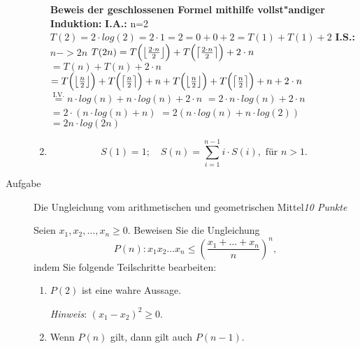 \documentclass[a4paper,twoside,12pt]{article}
\newcounter{AUFGNR}
\newcommand{\AUFGABE}[2]{\vspace{0.3cm}\item[Aufgabe \arabic{AUFGNR}]\stepcounter{AUFGNR} #1\hfill\emph{#2}}
\begin{document}
\begin{description}
\begin{enumerate}
\smallskip
\smallskip
\textbf{Beweis der geschlossenen Formel mithilfe vollst"andiger Induktion:}
\newline
\newline \textbf{I.A.:}
\newline n=2
\newline $T(2)=2 \cdot log(2)=2 \cdot 1=2=0+0+2=T(1)+T(1)+2$
\newline
\newline \textbf{I.S.:}
\newline
\newline $n->2n$
\newline $T(2n)=  T\Bigl(\left\lfloor \frac{2 \cdot n}{2}\right\rfloor\Bigr) +
                 T\Bigl(\left\lceil \frac{2 \cdot n}{2} \right\rceil\Bigr) + 2 \cdot n $
\newline $= T(n) + T(n) + 2 \cdot n$
\newline $= T\Bigl(\left\lfloor \frac{n}{2}\right\rfloor\Bigr) +
                 T\Bigl(\left\lceil \frac{n}{2} \right\rceil\Bigr) + n + T\Bigl(\left\lfloor \frac{n}{2}\right\rfloor\Bigr) +
                 T\Bigl(\left\lceil \frac{n}{2} \right\rceil\Bigr) + n + 2 \cdot n$       
\newline $\overset{\text{I.V.}}{=} n \cdot log(n) + n \cdot log(n) + 2 \cdot n$
\newline $= 2 \cdot n \cdot log(n) + 2 \cdot n$
\newline $= 2 \cdot (n \cdot log(n) + n)$
\newline $= 2(n \cdot log(n) + n \cdot log(2))$
\newline $= 2n \cdot log(2n)$

  \item 
    \[
      S(1) = 1; \quad S(n) = \sum_{i=1}^{n-1} i \cdot S(i), 
        \text{ f\"ur } n > 1.
    \]
    
\end{enumerate}


\AUFGABE{Die Ungleichung vom arithmetischen und geometrischen Mittel}{10 Punkte}


Seien $x_1, x_2, \ldots, x_n \geq 0$. Beweisen Sie
die Ungleichung
\[
P(n): x_1 x_2 \ldots x_n
\leq\left(\frac{x_1+\dots+x_n}{n}\right)^n,
\]
indem Sie folgende Teilschritte bearbeiten:
\begin{enumerate}
  \item $P(2)$ ist eine wahre Aussage.

     \emph{Hinweis}: $(x_1 - x_2)^2 \geq 0$.
  \item
     Wenn $P(n)$ gilt, dann gilt auch $P(n-1)$.


\end{enumerate}
\end{description}
\end{document}
